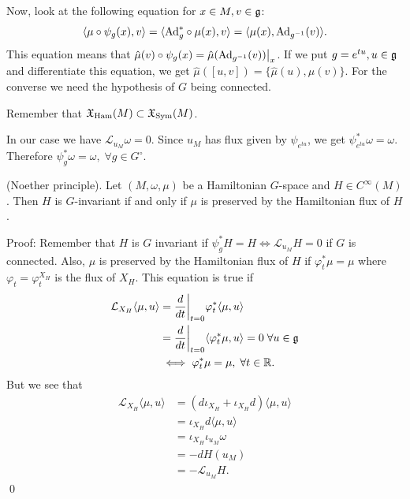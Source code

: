 Now, look at the following equation for $x\in M, v\in \mathfrak{g}$:
\begin{equation}
    \langle \mu\circ\psi_g(x),v\rangle = \langle\text{Ad}_g^*\circ\mu(x),v\rangle = \langle \mu(x), \text{Ad}_{g^{-1}}(v)\rangle.
\end{equation}
This equation means that $\hat{\mu}(v)\circ\psi_g(x)=\hat{\mu}(\text{Ad}_{g^{-1}}(v))\big|_x$. If we put $g=e^{tu},u\in\mathfrak{g}$ and 
differentiate this equation, we get $\hat{\mu}([u,v])=\{\hat{\mu}(u),\hat{\mu}(v)\}$. For the converse we need the hypothesis 
of $G$ being connected.\par 

\begin{remark}
    Remember that $\mathfrak{X}_{\text{Ham}}(M)\subset\mathfrak{X}_{\text{Sym}}(M)$. 
\end{remark}

In our case we have $\mathcal{L}_{u_M}\omega = 0$. Since $u_M$ has flux given by $\psi_{e^{tu}}$, we get 
$\psi_{e^{tu}}^*\omega=\omega$. Therefore $\psi_g^*\omega = \omega,\;\forall g\in G^\circ$.
    
\begin{dang}
    \begin{theorem}
        (Noether principle). Let $(M,\omega,\mu)$ be a Hamiltonian $G$-space and $H\in C^\infty(M)$. Then 
        $H$ is $G$-invariant if and only if $\mu$ is preserved by the Hamiltonian flux of $H$.
    \end{theorem}
\end{dang}
Proof: Remember that $H$ is $G$ invariant if $\psi_g^*H=H\iff\mathcal{L}_{u_M}H=0$ if $G$ is connected. Also, 
$\mu$ is preserved by the Hamiltonian flux of $H$ if $\varphi_t^*\mu=\mu$ where $\varphi_t=\varphi_t^{X_H}$ is the 
flux of $X_H$. This equation is true if 
\begin{equation}
    \begin{split}
        \mathcal{L}_{X_H}\langle\mu,u\rangle &= \frac{d}{dt}\bigg|_{t=0}\varphi_t^*\langle\mu,u\rangle\\
           &=\frac{d}{dt}\bigg|_{t=0}\langle\varphi_t^*\mu,u\rangle=0\;\forall u\in\mathfrak{g}\\
           &\iff \varphi_t^*\mu =\mu,\;\forall t\in\mathbb{R}.
    \end{split}
\end{equation}
But we see that 
\begin{equation}
    \begin{split}
        \mathcal{L}_{X_H}\langle\mu,u\rangle &= (d\iota_{X_H}+\iota_{X_H}d)\langle\mu,u\rangle\\
        &=\iota_{X_H}d\langle\mu,u\rangle\\
        &=\iota_{X_H}\iota_{u_M}\omega\\
        &=-dH(u_M)\\
        &=-\mathcal{L}_{u_M}H.
    \end{split}
\end{equation}
\qed

